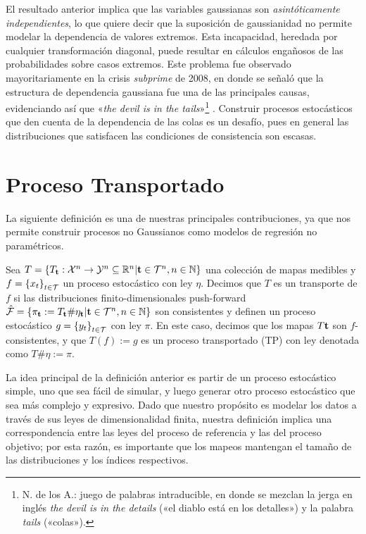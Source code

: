 El resultado anterior implica que las variables gaussianas son \emph{asintóticamente independientes}, lo que quiere decir que la suposición de gaussianidad no permite modelar la dependencia de valores extremos. Esta incapacidad, heredada por cualquier transformación diagonal, puede resultar en cálculos engañosos de las probabilidades sobre casos extremos. Este problema fue observado mayoritariamente en la crisis \emph{subprime} de 2008, en donde se señaló que la estructura de dependencia gaussiana fue una de las principales causas, evidenciando así que «\emph{the devil is in the tails}»\footnote{N. de los A.: juego de palabras intraducible, en donde se mezclan la jerga en inglés \emph{the devil is in the details} («el diablo está en los detalles») y la palabra \emph{tails} («colas»).} \cite{donnelly2010devil}. Construir procesos estocásticos que den cuenta de la dependencia de las colas es un desafío, pues en general las distribuciones que satisfacen las condiciones de consistencia son escasas.


\section{Proceso Transportado}
\label{sec:deftgp}


La siguiente definición es una de nuestras principales contribuciones, ya que nos permite construir procesos no Gaussianos como modelos de regresión no paramétricos.

\begin{definition}
	Sea \(T=\{T_{\mathbf{t}}:\mathcal{X}^n \to \mathcal{Y}^n \subseteq \mathbb{R}^n | \mathbf{t} \in \mathcal{T}^n, n \in \mathbb{N}\}\) una colección de mapas medibles y \(f=\left\{x_{t}\right\}_{t\in \mathcal{T}}\) un proceso estocástico con ley \(\eta\). Decimos que \(T\) es un transporte de \(f\) si las distribuciones finito-dimensionales push-forward \(\mathcal{\hat F}=\{\pi_{\mathbf{t}}:=T_{\mathbf{t}}\#\eta_{\mathbf{t}}| \mathbf{t} \in \mathcal{T}^n, n \in \mathbb{N}\}\) son consistentes y definen un proceso estocástico \(g=\left\{ y_{t}\right\}_{t\in \mathcal{T}}\) con ley \(\pi\). En este caso, decimos que los mapas \(T\mathbf{t}\) son \(f\)-consistentes, y que \(T(f) := g\) es un proceso transportado (TP) con ley denotada como \(T\#\eta := \pi\).
\end{definition}

La idea principal de la definición anterior es partir de un proceso estocástico simple, uno que sea fácil de simular, y luego generar otro proceso estocástico que sea más complejo y expresivo. Dado que nuestro propósito es modelar los datos a través de sus leyes de dimensionalidad finita, nuestra definición implica una correspondencia entre las leyes del proceso de referencia y las del proceso objetivo; por esta razón, es importante que los mapeos mantengan el tamaño de las distribuciones y los índices respectivos.

